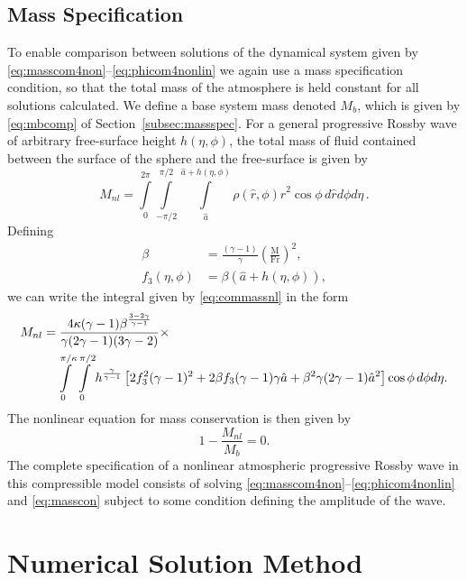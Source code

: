 \subsection{Mass Specification}
To enable comparison between solutions of the dynamical system given by \eqref{eq:masscom4non}--\eqref{eq:phicom4nonlin} we again use a mass specification condition, so that the total mass of the atmosphere is held constant for all solutions calculated. We define a base system mass denoted $M_b$, which is given by \eqref{eq:mbcomp} of Section~\ref{subsec:massspec}. For a general progressive Rossby wave of arbitrary free-surface height $h(\eta,\phi)$, the total mass of fluid contained between the surface of the sphere and the free-surface is given by
\begin{equation}
M_{nl}=\int\limits_0^{2\pi} \int\limits_{-\pi/2}^{\pi/2} \int\limits_{\hat{a}}^{\hat{a}+h(\eta,\phi)} \rho(\hat{r},\phi)\hat{r}^2 \cos\phi\,d\hat{r} d\phi d\eta\,. \label{eq:commassnl}
\end{equation}
Defining 
\begin{align}
\beta &= \frac{(\gamma-1)}{\gamma} \left(\frac{\mathrm{M}}{\mathrm{Fr}} \right)^2, \\
f_3(\eta,\phi) &= \beta(\hat{a}+h(\eta,\phi)),
\end{align}
we can write the integral given by \eqref{eq:commassnl} in the form
\begin{align}
M_{nl} &= \frac{4\kappa (\gamma-1)\beta^{\frac{3-2\gamma}{\gamma-1}}}{\gamma(2\gamma-1)(3\gamma-2)} \times \notag \\
&\quad \int\limits_{0}^{\pi/\kappa} \int\limits_{0}^{\pi/2} h^{\frac{\gamma}{\gamma-1}} \left[2f_3^2(\gamma-1)^2 + 2\beta f_3 (\gamma-1)\gamma \hat{a} + \beta^2\gamma(2\gamma-1)\hat{a}^2 \right]\cos\phi\,d\phi d\eta . \label{eq:mnlcomp}
\end{align}
The nonlinear equation for mass conservation is then given by
\begin{equation}
1-\frac{M_{nl}}{M_b}=0. \label{eq:masscon}
\end{equation}
The complete specification of a nonlinear atmospheric progressive Rossby wave in this compressible model consists of solving \eqref{eq:masscom4non}--\eqref{eq:phicom4nonlin} and \eqref{eq:masscon} subject to some condition defining the amplitude of the wave.

\section{Numerical Solution Method}
\label{sec:nonlinnumer}
